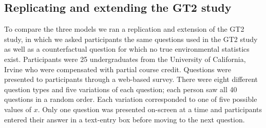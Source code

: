 \documentclass[doc,floatsintext]{apa6}
\begin{document}
\subsection*{Replicating and extending the GT2 study}

To compare the three models we ran a replication and extension of the GT2 study, in which we asked participants the same questions used in the GT2 study as well as a counterfactual question for which no true environmental statistics exist. Participants were 25 undergraduates from the University of California, Irvine who were compensated with partial course credit. Questions were presented to participants through a web-based survey. There were eight different question types and five variations of each question; each person saw all 40 questions in a random order. Each variation corresponded to one of five possible values of $x$. Only one question was presented on-screen at a time and participants entered their answer in a text-entry box before moving to the next question.
\end{document}
